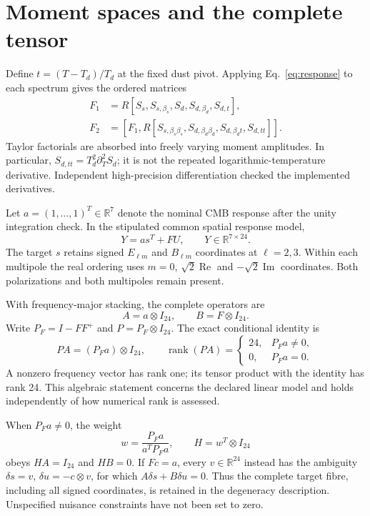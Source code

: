 \documentclass[aps,prd,preprint,nofootinbib,11pt]{revtex4-2}
\newcommand{\R}{\mathbb R}
\begin{document}
\section{Moment spaces and the complete tensor}
Define $t=(T-T_d)/T_d$ at the fixed dust pivot. Applying Eq.~\eqref{eq:response} to each spectrum gives the ordered matrices
\begin{align}
 F_1&=R[S_s,S_{s,\beta_s},S_d,S_{d,\beta_d},S_{d,t}],\\
 F_2&=[F_1,R[S_{s,\beta_s\beta_s},S_{d,\beta_d\beta_d},
 S_{d,\beta_dt},S_{d,tt}]].
\end{align}
Taylor factorials are absorbed into freely varying moment amplitudes. In particular, $S_{d,tt}=T_d^2\partial_T^2S_d$; it is not the repeated logarithmic-temperature derivative. Independent high-precision differentiation checked the implemented derivatives.

Let $a=(1,\ldots,1)^T\in\R^7$ denote the nominal CMB response after the unity integration check. In the stipulated common spatial response model,
\begin{equation}
 Y=a s^T+F U,\qquad Y\in\R^{7\times24}.
\end{equation}
The target $s$ retains signed $E_{\ell m}$ and $B_{\ell m}$ coordinates at $\ell=2,3$. Within each multipole the real ordering uses $m=0$, $\sqrt2\operatorname{Re}$ and $-\sqrt2\operatorname{Im}$ coordinates. Both polarizations and both multipoles remain present.

With frequency-major stacking, the complete operators are
\begin{equation}
 A=a\otimes I_{24},\qquad B=F\otimes I_{24}.
\end{equation}
Write $P_F=I-FF^+$ and $P=P_F\otimes I_{24}$. The exact conditional identity is
\begin{equation}
 PA=(P_Fa)\otimes I_{24},\qquad
 \operatorname{rank}(PA)=
 \begin{cases}24,&P_Fa\ne0,\\0,&P_Fa=0.\end{cases}\label{eq:rank}
\end{equation}
A nonzero frequency vector has rank one; its tensor product with the identity has rank 24. This algebraic statement concerns the declared linear model and holds independently of how numerical rank is assessed.

When $P_Fa\ne0$, the weight
\begin{equation}
 w=\frac{P_Fa}{a^TP_Fa},\qquad H=w^T\otimes I_{24}
\end{equation}
obeys $HA=I_{24}$ and $HB=0$. If $Fc=a$, every $v\in\R^{24}$ instead has the ambiguity $\delta s=v$, $\delta u=-c\otimes v$, for which $A\delta s+B\delta u=0$. Thus the complete target fibre, including all signed coordinates, is retained in the degeneracy description. Unspecified nuisance constraints have not been set to zero.
\clearpage
\end{document}
